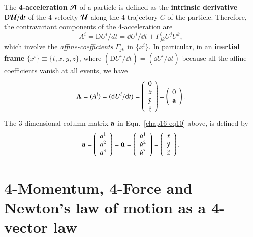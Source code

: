 The \textbf{4-acceleration}   $\bm{\mathcal{A}}$ of a particle is defined as the \textbf{intrinsic derivative} ${\mathrm{D}} \bm{\mathcal{U}}/\mathrm{d} t$ of the 4-velocity $\bm{\mathcal{U}}$ along the 4-trajectory $C$ of the particle. Therefore, the contravariant components of the 4-acceleration are 
\begin{equation}
A^i= {\mathrm{D}}U^i /dt=\dd  U^i /\dd t + \Gamma^i _{jk}  U^j U^k ,\label{chap16-eq9}
\end{equation}
which involve the \textsl{affine-coefficients}  $\Gamma^i_{jk}$ in $\{x^i\}$. In particular, in an \textbf{inertial frame} $\{x^i\}\equiv\{t,x,y,z\}$, where $({\mathrm D}U^i/\dd t)=    ( \dd U^i /\dd t)$ because  all the affine-coefficients vanish at all events, we have
\begin{equation}
{\mathbf{A}}=(A^i) =( \mathrm{d} U^i /\mathrm{d} t)=\left(\begin{array}{c} 0\\ \ddot{x}
\\ \ddot{y}\\ \ddot{z}\end{array}\right)
 =\left(\begin{array}{c} 0\\ \mathbf{a}\end{array}\right).\label{chap16-eq10}
\end{equation}
The  3-dimensional column matrix $\mathbf{a}$ in Eqn.~\eqref{chap16-eq10} above, is defined by  
\begin{equation}
\mathbf{a}=\left(\begin{array}{c}
a^1\\a^2\\a^3\end{array}\right)=\dot{\mathbf{u}}=\left(\begin{array}{c}
\dot{u}^1\\\dot{u}^2\\\dot{u}^3\end{array}\right)
= \left(\begin{array}{c}\ddot{x}\\\ddot{y}\\\ddot{z}\end{array}\right).\label{chap16-eq11}
\end{equation}

\section{4-Momentum, 4-Force and Newton's law of motion as a 4-vector law}\label{chap16-sec4}

